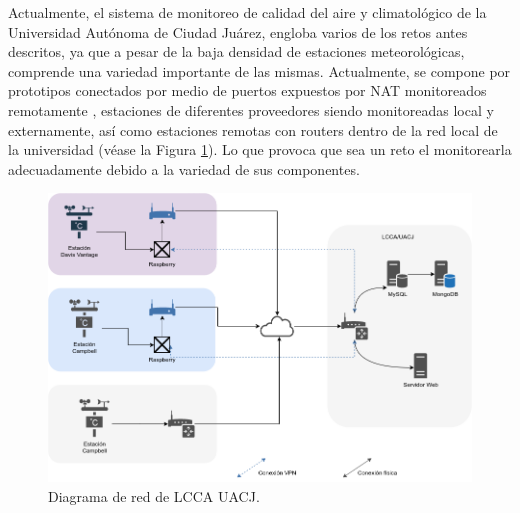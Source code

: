 


Actualmente, el sistema de monitoreo de calidad del aire y climatológico de la Universidad Autónoma de Ciudad Juárez, engloba varios de los retos antes descritos, ya que a pesar de la baja densidad de estaciones meteorológicas, comprende una variedad importante de las mismas. Actualmente, se compone por prototipos conectados por medio de puertos expuestos por NAT monitoreados remotamente \cite{red_climatologica_uacj}, estaciones de diferentes proveedores siendo monitoreadas local y externamente, así como estaciones remotas con routers dentro de la red local de la universidad (véase la Figura \ref{fig:current_network}). Lo que provoca que sea un reto el monitorearla adecuadamente debido a la variedad de sus componentes.

\begin{figure}[!ht]
	\centering
	\includegraphics[width=.80\linewidth]{images/diagrams/current_network.png}
	\caption{Diagrama de red de LCCA UACJ.}
	\label{fig:current_network}
\end{figure}


